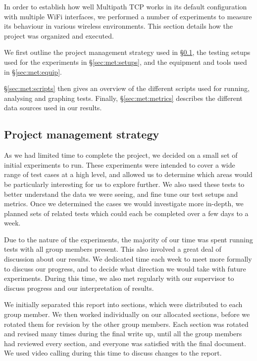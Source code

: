 In order to establish how well Multipath TCP works in its default configuration
with multiple WiFi interfaces, we performed a number of experiments to measure
its behaviour in various wireless environments. This section details how the
project was organized and executed.

We first outline the project management strategy used in \S\ref{sec:met:pm}, the
testing setups used for the experiments in \S\ref{sec:met:setups}, and the
equipment and tools used in \S\ref{sec:met:equip}.

\S\ref{sec:met:scripts} then gives an overview of the different scripts used for
running, analysing and graphing tests. Finally, \S\ref{sec:met:metrics}
describes the different data sources used in our results.

\subsection{Project management strategy}
\label{sec:met:pm}
As we had limited time to complete the project, we decided on a small set of
initial experiments to run. These experiments were intended to cover a wide
range of test cases at a high level, and allowed us to determine which areas
would be particularly interesting for us to explore further. We also used these
tests to better understand the data we were seeing, and fine tune our test
setups and metrics. Once we determined the cases we would investigate more
in-depth, we planned sets of related tests which could each be completed over a
few days to a week.

Due to the nature of the experiments, the majority of our time was spent running
tests with all group members present. This also involved a great deal of
discussion about our results. We dedicated time each week to meet more formally
to discuss our progress, and to decide what direction we would take with future
experiments. During this time, we also met regularly with our supervisor to
discuss progress and our interpretation of results.

We initially separated this report into sections, which were distributed to each
group member. We then worked individually on our allocated sections, before we
rotated them for revision by the other group members. Each section was rotated
and revised many times during the final write up, until all the group members
had reviewed every section, and everyone was satisfied with the final document.
We used video calling during this time to discuss changes to the report.

